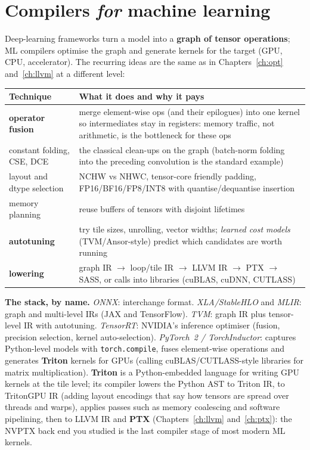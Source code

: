\documentclass[10pt,a4paper,openany,oneside]{report}
\newcommand{\prio}[1]{\texorpdfstring{\ifcase#1\or{\color{gold}\ding{72}}\or{\color{gold}\ding{72}\ding{72}}\or{\color{gold}\ding{72}\ding{72}\ding{72}}\fi}{}}
\begin{document}
\section{Compilers \emph{for} machine learning \prio{3}}
\label{sec:mlc}
Deep-learning frameworks turn a model into a \textbf{graph of tensor operations}; ML compilers optimise the graph and generate kernels for the target (GPU, CPU, accelerator). The recurring ideas are the same as in Chapters~\ref{ch:opt} and~\ref{ch:llvm} at a different level:
\begin{center}\small
\begin{xltabular}{\textwidth}{@{}L{3.3cm}Y@{}}
\toprule
\textbf{Technique} & \textbf{What it does and why it pays}\\
\midrule\endhead
\textbf{operator fusion} & merge element-wise ops (and their epilogues) into one kernel so intermediates stay in registers: memory traffic, not arithmetic, is the bottleneck for these ops\\
constant folding, CSE, DCE & the classical clean-ups on the graph (batch-norm folding into the preceding convolution is the standard example)\\
layout and dtype selection & NCHW vs NHWC, tensor-core friendly padding, FP16/BF16/FP8/INT8 with quantise/dequantise insertion\\
memory planning & reuse buffers of tensors with disjoint lifetimes\\
\textbf{autotuning} & try tile sizes, unrolling, vector widths; \emph{learned cost models} (TVM/Ansor-style) predict which candidates are worth running\\
\textbf{lowering} & graph IR $\to$ loop/tile IR $\to$ LLVM IR $\to$ PTX $\to$ SASS, or calls into libraries (cuBLAS, cuDNN, CUTLASS)\\
\bottomrule
\end{xltabular}
\end{center}
\textbf{The stack, by name.} \emph{ONNX}: interchange format. \emph{XLA/StableHLO} and \emph{MLIR}: graph and multi-level IRs (JAX and TensorFlow). \emph{TVM}: graph IR plus tensor-level IR with autotuning. \emph{TensorRT}: NVIDIA's inference optimiser (fusion, precision selection, kernel auto-selection). \emph{PyTorch~2 / TorchInductor}: captures Python-level models with \texttt{torch.compile}, fuses element-wise operations and generates \textbf{Triton} kernels for GPUs (calling cuBLAS/CUTLASS-style libraries for matrix multiplication). \textbf{Triton} is a Python-embedded language for writing GPU kernels at the tile level; its compiler lowers the Python AST to Triton IR, to TritonGPU IR (adding layout encodings that say how tensors are spread over threads and warps), applies passes such as memory coalescing and software pipelining, then to LLVM IR and \textbf{PTX} (Chapters~\ref{ch:llvm} and~\ref{ch:ptx}): the NVPTX back end you studied is the last compiler stage of most modern ML kernels.
\end{document}
